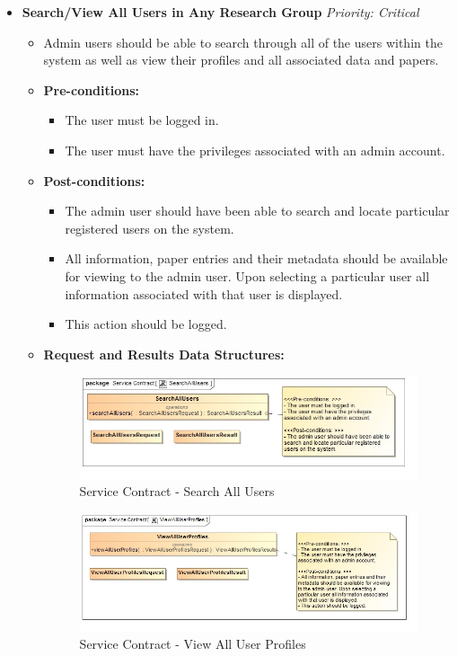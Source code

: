 \documentclass{article}
\begin{document}
\begin{itemize}
					\cleardoublepage
					\item \textbf{Search/View All Users in Any Research Group} \hfill \textit{Priority: Critical}
					\begin{itemize}
						\item Admin users should be able to search through all of the users within the system as well as view their profiles and all associated data and papers.
						\item \textbf{Pre-conditions:}
						\begin{itemize}
							\item The user must be logged in.
							\item The user must have the privileges associated with an admin account.
						\end{itemize}
						\item \textbf{Post-conditions:}
						\begin{itemize}
							\item The admin user should have been able to search and locate particular registered users on the system.
							\item All information, paper entries and their metadata should be available for viewing to the admin user. Upon selecting a particular user all information associated with that user is displayed.
							\item This action should be logged.
						\end{itemize}
						\item \textbf{Request and Results Data Structures:}
						\begin{figure}[H]
							\includegraphics[width=\linewidth]{../Diagrams/ServiceContracts/SearchAllUsers.jpg}
							\caption{Service Contract - Search All Users}
						\end{figure}
						\begin{figure}[H]
							\includegraphics[width=\linewidth]{../Diagrams/ServiceContracts/ViewAllUserProfiles.jpg}
							\caption{Service Contract - View All User Profiles}
						\end{figure}
					\end{itemize}
					

\end{itemize}
\end{document}
